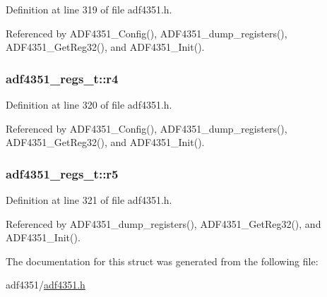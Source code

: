 Definition at line 319 of file adf4351.\+h.



Referenced by A\+D\+F4351\+\_\+\+Config(), A\+D\+F4351\+\_\+dump\+\_\+registers(), A\+D\+F4351\+\_\+\+Get\+Reg32(), and A\+D\+F4351\+\_\+\+Init().

\subsubsection[{\texorpdfstring{r4}{r4}}]{ adf4351\+\_\+regs\+\_\+t\+::r4}\hypertarget{structadf4351__regs__t_a343af9ab05747dd9b977603d02ebb4df}{}\label{structadf4351__regs__t_a343af9ab05747dd9b977603d02ebb4df}


Definition at line 320 of file adf4351.\+h.



Referenced by A\+D\+F4351\+\_\+\+Config(), A\+D\+F4351\+\_\+dump\+\_\+registers(), A\+D\+F4351\+\_\+\+Get\+Reg32(), and A\+D\+F4351\+\_\+\+Init().

\subsubsection[{\texorpdfstring{r5}{r5}}]{ adf4351\+\_\+regs\+\_\+t\+::r5}\hypertarget{structadf4351__regs__t_ab0bd52a2f47aa3f45d0aa97136ec6e8c}{}\label{structadf4351__regs__t_ab0bd52a2f47aa3f45d0aa97136ec6e8c}


Definition at line 321 of file adf4351.\+h.



Referenced by A\+D\+F4351\+\_\+dump\+\_\+registers(), A\+D\+F4351\+\_\+\+Get\+Reg32(), and A\+D\+F4351\+\_\+\+Init().



The documentation for this struct was generated from the following file\+:\begin{DoxyCompactItemize}
\item 
adf4351/\hyperlink{adf4351_8h}{adf4351.\+h}\end{DoxyCompactItemize}
